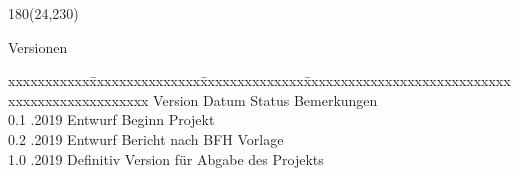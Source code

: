 
\begin{textblock}{180}(24,230)
\color{black}
\begin{huge}
Versionen
\end{huge}
\vspace{10mm}

\fontsize{10pt}{18pt}\selectfont
\begin{tabbing}
xxxxxxxxxxx\=xxxxxxxxxxxxxxx\=xxxxxxxxxxxxxx\=xxxxxxxxxxxxxxxxxxxxxxxxxxxxxxxxxxxxxxxxxxxxxxx \kill
Version	\> Datum	\> Status		\> Bemerkungen		\\
0.1	.2019	\> Entwurf		\> Beginn Projekt	\\	
0.2	.2019	\> Entwurf		\> Bericht nach BFH Vorlage	\\ 
1.0	.2019	\> Definitiv		\> Version für Abgabe des Projekts	\\ 
\end{tabbing}

\end{textblock}
